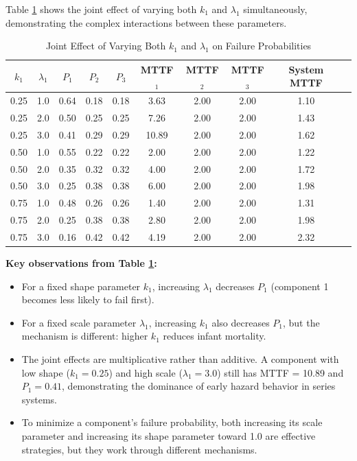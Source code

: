 \documentclass[11pt]{article}
\begin{document}
Table \ref{tab:vary-both} shows the joint effect of varying both $k_1$ and $\lambda_1$ simultaneously, demonstrating the complex interactions between these parameters.

\begin{table}[htbp]
\centering
\caption{Joint Effect of Varying Both $k_1$ and $\lambda_1$ on Failure Probabilities}
\label{tab:vary-both}
\small
\begin{tabular}{cccccccccc}
\hline
$k_1$ & $\lambda_1$ & $P_1$ & $P_2$ & $P_3$ & MTTF$_1$ & MTTF$_2$ & MTTF$_3$ & System MTTF \\
\hline
0.25 & 1.0 & 0.64 & 0.18 & 0.18 & 3.63 & 2.00 & 2.00 & 1.10 \\
0.25 & 2.0 & 0.50 & 0.25 & 0.25 & 7.26 & 2.00 & 2.00 & 1.43 \\
0.25 & 3.0 & 0.41 & 0.29 & 0.29 & 10.89 & 2.00 & 2.00 & 1.62 \\
0.50 & 1.0 & 0.55 & 0.22 & 0.22 & 2.00 & 2.00 & 2.00 & 1.22 \\
0.50 & 2.0 & 0.35 & 0.32 & 0.32 & 4.00 & 2.00 & 2.00 & 1.72 \\
0.50 & 3.0 & 0.25 & 0.38 & 0.38 & 6.00 & 2.00 & 2.00 & 1.98 \\
0.75 & 1.0 & 0.48 & 0.26 & 0.26 & 1.40 & 2.00 & 2.00 & 1.31 \\
0.75 & 2.0 & 0.25 & 0.38 & 0.38 & 2.80 & 2.00 & 2.00 & 1.98 \\
0.75 & 3.0 & 0.16 & 0.42 & 0.42 & 4.19 & 2.00 & 2.00 & 2.32 \\
\hline
\end{tabular}
\end{table}

\textbf{Key observations from Table \ref{tab:vary-both}:}

\begin{itemize}
\item For a fixed shape parameter $k_1$, increasing $\lambda_1$ decreases $P_1$ (component 1 becomes less likely to fail first).
\item For a fixed scale parameter $\lambda_1$, increasing $k_1$ also decreases $P_1$, but the mechanism is different: higher $k_1$ reduces infant mortality.
\item The joint effects are multiplicative rather than additive. A component with low shape ($k_1 = 0.25$) and high scale ($\lambda_1 = 3.0$) still has MTTF = 10.89 and $P_1 = 0.41$, demonstrating the dominance of early hazard behavior in series systems.
\item To minimize a component's failure probability, both increasing its scale parameter and increasing its shape parameter toward 1.0 are effective strategies, but they work through different mechanisms.
\end{itemize}
\end{document}
